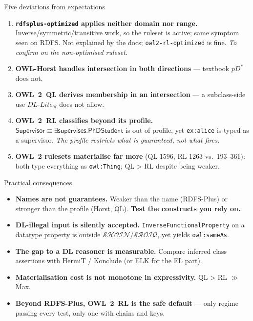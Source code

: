 \documentclass[10pt,aspectratio=169,xcolor=table]{beamer}
\newcommand{\dl}[1]{\ensuremath{\mathcal{#1}}}
\newcommand{\SROIQ}{\dl{SROIQ}}
\newcommand{\SHOIN}{\dl{SHOIN}}
\newcommand{\dllite}[1]{\ensuremath{\textit{DL-Lite}_{#1}}}
\newcommand{\cn}[1]{\mathsf{#1}}
\newcommand{\rn}[1]{\mathsf{#1}}
\newcommand{\eqv}{\equiv}
\newcommand{\hl}[1]{\textcolor{accent}{\textbf{#1}}}
\begin{document}
\begin{frame}{Five deviations from expectations}
  \small
  \begin{enumerate}
    \item \textbf{\texttt{rdfsplus-optimized} applies neither domain nor range.}
      Inverse/symmetric/transitive work, so the ruleset is active; same symptom seen on RDFS.
      Not explained by the docs; \texttt{owl2-rl-optimized} is fine.
      \emph{To confirm on the non-optimised ruleset.}
    \item \textbf{OWL-Horst handles intersection in both directions} --- textbook $pD^*$ does not.
    \item \textbf{OWL~2~QL derives membership in an intersection} --- a subclass-side use
      $\dllite{\mathcal{R}}$ does not allow.
    \item \textbf{OWL~2~RL classifies beyond its profile.}
      $\cn{Supervisor} \eqv \exists\rn{supervises}.\cn{PhDStudent}$ is out of profile,
      yet \texttt{ex:alice} is typed as a supervisor.
      \emph{The profile restricts what is guaranteed, not what fires.}
    \item \textbf{OWL~2 rulesets materialise far more} (QL 1596, RL 1263 vs.\ 193--361):
      both type everything as \texttt{owl:Thing}; QL > RL despite being weaker.
  \end{enumerate}
\end{frame}

\begin{frame}{Practical consequences}
  \begin{itemize}
    \item \textbf{Names are not guarantees.} Weaker than the name (RDFS-Plus) or stronger
      than the profile (Horst, QL). \hl{Test the constructs you rely on.}
    \item \textbf{DL-illegal input is silently accepted.} \texttt{InverseFunctionalProperty}
      on a datatype property is outside \SHOIN/\SROIQ, yet yields \texttt{owl:sameAs}.
    \item \textbf{The gap to a DL reasoner is measurable.} Compare inferred class assertions
      with HermiT / Konclude (or ELK for the EL part).
    \item \textbf{Materialisation cost is not monotone in expressivity.} QL > RL $\gg$ Max.
    \item \textbf{Beyond RDFS-Plus, OWL~2~RL is the safe default} --- only regime passing every
      test, only one with chains and keys.
  \end{itemize}
\end{frame}
\end{document}
